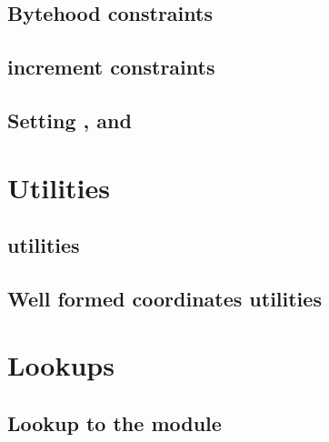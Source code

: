 \subsection{Bytehood constraints}                                           \label{bls: bytehood and accumulator}                                
\subsection{\blsId{} increment constraints}                                 \label{bls: stamp increments}                                        

\subsection{Setting \malformedDataBit, \malformedDataAcc and \malformedDataExternalJustification}     \label{bls: malformed bit acc justification}                    

\section{Utilities}                                                                                                                             
\subsection{\wcpMod{} utilities}                                            \label{bls: wcp utilities}                                           
\subsection{Well formed coordinates utilities}                              \label{bls: well formed coordinates utilities}                       
     
\section{Lookups}     
\subsection{Lookup to the \wcpMod{} module}                                 \label{bls: lookups: wcp}                                            
     
